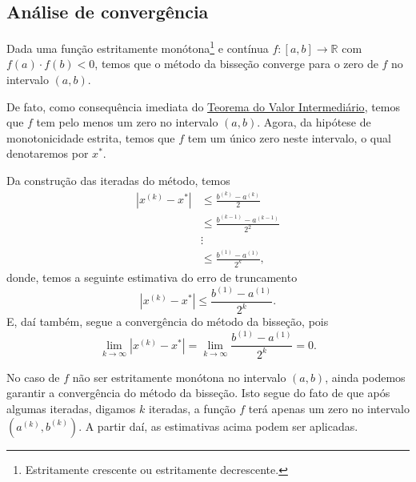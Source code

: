\subsection{Análise de convergência}

Dada uma função estritamente monótona\footnote{Estritamente crescente ou estritamente decrescente.} e contínua $f:[a, b]\to\mathbb{R}$ com $f(a)\cdot f(b) < 0$, temos que o método da bisseção converge para o zero de $f$ no intervalo $(a, b)$. 

De fato, como consequência imediata do \href{https://notaspedrok.com.br/notas/CalculoI/cap_lim_sec_cont.html#teo:valorintermediario}{Teorema do Valor Intermediário}, temos que $f$ tem pelo menos um zero no intervalo $(a, b)$. Agora, da hipótese de monotonicidade estrita, temos que $f$ tem um único zero neste intervalo, o qual denotaremos por $x^{*}$.

Da construção das iteradas do método, temos
\begin{align}
  |x^{(k)} - x^{*}| &\leq \frac{b^{(k)}-a^{(k)}}{2}\\
  &\leq \frac{b^{(k-1)}-a^{(k-1)}}{2^2}\\
  &\vdots \\
  &\leq \frac{b^{(1)}-a^{(1)}}{2^k},
\end{align}
donde, temos a seguinte estimativa do erro de truncamento
\begin{equation}\label{eq:bis_est_trunc}
  |x^{(k)} - x^{*}| \leq \frac{b^{(1)}-a^{(1)}}{2^k}.
\end{equation}
E, daí também, segue a convergência do método da bisseção, pois
\begin{equation}
  \lim_{k\to\infty} |x^{(k)}-x^{*}| = \lim_{k\to\infty} \frac{b^{(1)}-a^{(1)}}{2^k} = 0.
\end{equation}

\begin{obs}
  No caso de $f$ não ser estritamente monótona no intervalo $(a, b)$, ainda podemos garantir a convergência do método da bisseção. Isto segue do fato de que após algumas iteradas, digamos $k$ iteradas, a função $f$ terá apenas um zero no intervalo $(a^{(k)}, b^{(k)})$. A partir daí, as estimativas acima podem ser aplicadas.
\end{obs}

